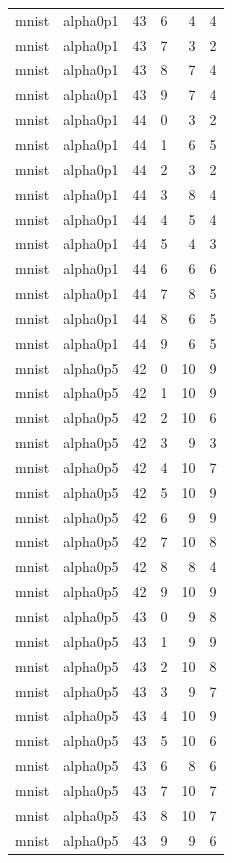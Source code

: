 \begin{tabular}{llrrrr}
mnist & alpha0p1 & 43 & 6 & 4 & 4 \\
mnist & alpha0p1 & 43 & 7 & 3 & 2 \\
mnist & alpha0p1 & 43 & 8 & 7 & 4 \\
mnist & alpha0p1 & 43 & 9 & 7 & 4 \\
mnist & alpha0p1 & 44 & 0 & 3 & 2 \\
mnist & alpha0p1 & 44 & 1 & 6 & 5 \\
mnist & alpha0p1 & 44 & 2 & 3 & 2 \\
mnist & alpha0p1 & 44 & 3 & 8 & 4 \\
mnist & alpha0p1 & 44 & 4 & 5 & 4 \\
mnist & alpha0p1 & 44 & 5 & 4 & 3 \\
mnist & alpha0p1 & 44 & 6 & 6 & 6 \\
mnist & alpha0p1 & 44 & 7 & 8 & 5 \\
mnist & alpha0p1 & 44 & 8 & 6 & 5 \\
mnist & alpha0p1 & 44 & 9 & 6 & 5 \\
mnist & alpha0p5 & 42 & 0 & 10 & 9 \\
mnist & alpha0p5 & 42 & 1 & 10 & 9 \\
mnist & alpha0p5 & 42 & 2 & 10 & 6 \\
mnist & alpha0p5 & 42 & 3 & 9 & 3 \\
mnist & alpha0p5 & 42 & 4 & 10 & 7 \\
mnist & alpha0p5 & 42 & 5 & 10 & 9 \\
mnist & alpha0p5 & 42 & 6 & 9 & 9 \\
mnist & alpha0p5 & 42 & 7 & 10 & 8 \\
mnist & alpha0p5 & 42 & 8 & 8 & 4 \\
mnist & alpha0p5 & 42 & 9 & 10 & 9 \\
mnist & alpha0p5 & 43 & 0 & 9 & 8 \\
mnist & alpha0p5 & 43 & 1 & 9 & 9 \\
mnist & alpha0p5 & 43 & 2 & 10 & 8 \\
mnist & alpha0p5 & 43 & 3 & 9 & 7 \\
mnist & alpha0p5 & 43 & 4 & 10 & 9 \\
mnist & alpha0p5 & 43 & 5 & 10 & 6 \\
mnist & alpha0p5 & 43 & 6 & 8 & 6 \\
mnist & alpha0p5 & 43 & 7 & 10 & 7 \\
mnist & alpha0p5 & 43 & 8 & 10 & 7 \\
mnist & alpha0p5 & 43 & 9 & 9 & 6 \\

\end{tabular}
